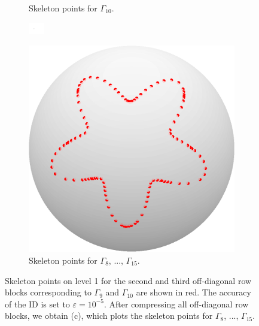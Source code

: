 \documentclass{sfuthesis}
\begin{document}
\begin{figure}[h]
\begin{subfigure}[b]{0.24\textwidth}
    		\caption{Skeleton points for $\Gamma_{10}$.} 
       \end{subfigure}
       \hspace{1cm}
       \begin{subfigure}[t]{0.18\textwidth}
      		\includegraphics[width=0.7cm]{dots2}
      \end{subfigure}
      \hspace{-0.8cm}
     \begin{subfigure}[b]{0.24\textwidth}
     \captionsetup{justification=centering}
      		\includegraphics[width=\textwidth]{BFRecLev1HorSkelAll}
    		\caption{Skeleton points for $\Gamma_8$, ..., $\Gamma_{15}$.} 
      \end{subfigure}
      \caption{Skeleton points on level 1 for the second and third off-diagonal row blocks corresponding to $\Gamma_9$ and $\Gamma_{10}$ are shown in red. The accuracy of the ID is set to $\varepsilon=10^{-5}$. After compressing all off-diagonal row blocks, we obtain (c), which plots the skeleton points for $\Gamma_8$, ..., $\Gamma_{15}$. }
	\label{fig: BFRecLev1HorSkeleton}
\end{figure}
       
\end{document}
